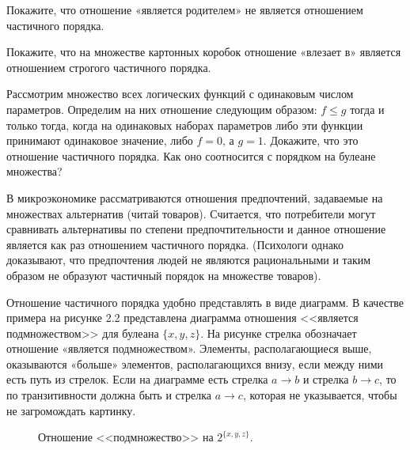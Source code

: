 \begin{exercise}
Покажите, что отношение «является родителем» не является отношением частичного порядка.
\end{exercise}

\begin{exercise}
Покажите, что на множестве картонных коробок отношение «влезает в» является отношением строгого частичного порядка.
\end{exercise}

\begin{exercise}
Рассмотрим множество всех логических функций с одинаковым числом параметров. Определим на них отношение следующим образом: $f\le g$ тогда и только тогда, когда на одинаковых наборах параметров либо эти функции принимают одинаковое значение, либо $f=0$, а $g=1$. Докажите, что это отношение частичного порядка. Как оно соотносится с порядком на булеане множества?
\end{exercise}

\begin{example}
В микроэкономике рассматриваются отношения предпочтений, задаваемые на множествах альтернатив (читай товаров). Считается, что потребители могут сравнивать альтернативы по степени предпочтительности и данное отношение является как раз отношением частичного порядка. (Психологи однако доказывают, что предпочтения людей не являются рациональными и таким образом не образуют частичный порядок на множестве товаров).
\end{example}

Отношение частичного порядка удобно представлять в виде диаграмм. В качестве примера на рисунке 2.2 представлена диаграмма отношения <<является подмножеством>> для булеана $\{x, y, z\}$. На рисунке стрелка обозначает отношение «является подмножеством». Элементы, располагающиеся выше, оказываются «больше» элементов, располагающихся внизу, если между ними есть путь из стрелок. Если на диаграмме есть стрелка $a\to b$ и стрелка $b\to c$, то по транзитивности должна быть и стрелка $a\to c$, которая не указывается, чтобы не загромождать картинку.

\begin{figure}[h]
\centering
{}
\caption{Отношение <<подмножество>> на $2^{\{x, y, z\}}$.}
\end{figure}

